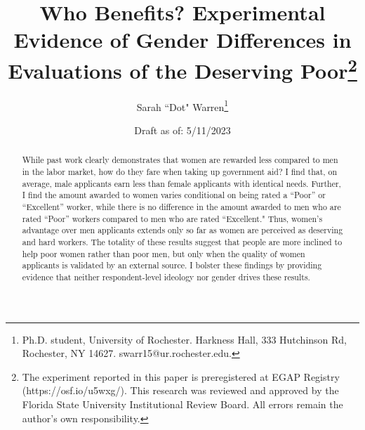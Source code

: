 \documentclass[12pt]{article}%
\author{Sarah ``Dot" Warren\thanks{Ph.D. student, University of Rochester. Harkness Hall, 333 Hutchinson Rd, Rochester, NY 14627. swarr15@ur.rochester.edu.}}
\title{Who Benefits? Experimental Evidence of Gender Differences in Evaluations of the Deserving Poor\thanks{The experiment reported in this paper is preregistered at EGAP Registry (https://osf.io/u5wxg/). This research was reviewed and approved by the Florida State University Institutional Review Board. All errors remain the author's own responsibility.}}
\date{Draft as of: 5/11/2023}
\begin{document}
\maketitle
\thispagestyle{empty}


\begin{abstract}
While past work clearly demonstrates that women are rewarded less compared to men in the labor market, how do they fare when taking up government aid? I find that, on average, male applicants earn less than female applicants with identical needs. Further, I find the amount awarded to women varies conditional on being rated a ``Poor” or ``Excellent” worker, while there is no difference in the amount awarded to men who are rated ``Poor” workers compared to men who are rated ``Excellent." Thus, women’s advantage over men applicants extends only so far as women are perceived as deserving and hard workers. The totality of these results suggest that people are more inclined to help poor women rather than poor men, but only when the quality of women applicants is validated by an external source. I bolster these findings by providing evidence that neither respondent-level ideology nor gender drives these results.


\end{abstract}


\newpage
\end{document}
